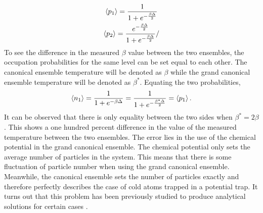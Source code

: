 \begin{gather}
    \left<{p_1}\right>=\frac{1}{1+e^{-\frac{\beta\Delta}{2}}}\\
    \left<{p_2}\right>=\frac{e^{-\frac{\beta\Delta}{2}}}{1+ e^{-\frac{\beta\Delta}{2}}}/
\end{gather}
To see the difference in the measured $\beta$ value between the two ensembles, the occupation probabilities for the same level can be set equal to each other. The canonical ensemble temperature will be denoted as $\beta$ while the grand canonical ensemble temperature will be denoted as $\beta^*$. Equating the two probabilities, 
\begin{gather}
    \left<{n_1}\right>=\frac{1}{1+e^{-\beta\Delta}}=\frac{1}{1+e^{-\frac{\beta^*\Delta}{2}}}=\left<{p_1}\right>.
\end{gather}
It can be observed that there is only equality between the two sides when $\beta^*=2\beta$. This shows a one hundred percent difference in the value of the measured temperature between the two ensembles. The error lies in the use of the chemical potential in the grand canonical ensemble. The chemical potential only sets the average number of particles in the system. This means that there is some fluctuation of particle number when using the grand canonical ensemble. Meanwhile, the canonical ensemble sets the number of particles exactly and therefore perfectly describes the case of cold atoms trapped in a potential trap. It turns out that this problem has been previously studied to produce analytical solutions for certain cases \cite{Borr1993} \cite{Schon1996} \cite{Hatem2020}. 

